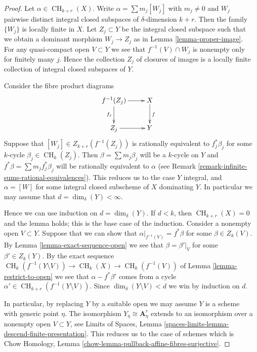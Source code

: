 \documentclass{stacks-project}
\theoremstyle{plain}
\theoremstyle{definition}
\theoremstyle{remark}
\numberwithin{equation}{subsection}
\def\CH{\mathop{\mathrm{CH}}\nolimits}
\begin{document}
\begin{proof}
Let $\alpha \in \CH_{k + r}(X)$. Write $\alpha = \sum m_j[W_j]$ with
$m_j \not = 0$ and $W_j$ pairwise distinct integral closed subspaces of
$\delta$-dimension $k + r$. Then the family $\{W_j\}$
is locally finite in $X$. Let $Z_j \subset Y$ be the integral
closed subspace such that we obtain a dominant morphism $W_j \to Z_j$
as in Lemma \ref{lemma-proper-image}. For any quasi-compact open
$V \subset Y$ we see that $f^{-1}(V) \cap W_j$
is nonempty only for finitely many $j$. Hence the
collection $Z_j$ of closures of images is a locally finite collection
of integral closed subspaces of $Y$.

\medskip\noindent
Consider the fibre product diagrams
$$
\xymatrix{
f^{-1}(Z_j) \ar[r] \ar[d]_{f_j} & X \ar[d]^f \\
Z_j \ar[r] & Y
}
$$
Suppose that $[W_j] \in Z_{k + r}(f^{-1}(Z_j))$
is rationally equivalent to $f_j^*\beta_j$ for some
$k$-cycle $\beta_j \in \CH_k(Z_j)$. Then
$\beta = \sum m_j \beta_j$ will be a $k$-cycle on $Y$
and $f^*\beta = \sum m_j f_j^*\beta_j$ will be rationally
equivalent to $\alpha$ (see
Remark \ref{remark-infinite-sums-rational-equivalences}).
This reduces us to the case $Y$ integral, and
$\alpha = [W]$ for some integral closed subscheme
of $X$ dominating $Y$. In particular we may
assume that $d = \dim_\delta(Y) < \infty$.

\medskip\noindent
Hence we can use induction on $d = \dim_\delta(Y)$.
If $d < k$, then $\CH_{k + r}(X) = 0$ and the lemma holds;
this is the base case of the induction.
Consider a nonempty open $V \subset Y$.
Suppose that we can show that $\alpha|_{f^{-1}(V)} = f^*\beta$
for some $\beta \in Z_k(V)$. By Lemma \ref{lemma-exact-sequence-open}
we see that
$\beta = \beta'|_V$ for some $\beta' \in Z_k(Y)$.
By the exact sequence
$\CH_k(f^{-1}(Y \setminus V)) \to \CH_k(X) \to \CH_k(f^{-1}(V))$
of Lemma \ref{lemma-restrict-to-open}
we see that $\alpha - f^*\beta'$ comes from
a cycle $\alpha' \in \CH_{k + r}(f^{-1}(Y \setminus V))$.
Since $\dim_\delta(Y \setminus V) < d$ we win by
induction on $d$.

\medskip\noindent
In particular, by replacing $Y$ by a suitable open we may assume
$Y$ is a scheme with generic point $\eta$. The isomorphism
$Y_\eta \cong \mathbf{A}^r_\eta$ extends to an isomorphism
over a nonempty open $V \subset Y$, see
Limits of Spaces, Lemma \ref{spaces-limits-lemma-descend-finite-presentation}.
This reduces us to the case of schemes which is
Chow Homology, Lemma \ref{chow-lemma-pullback-affine-fibres-surjective}.
\end{proof}
\end{document}
